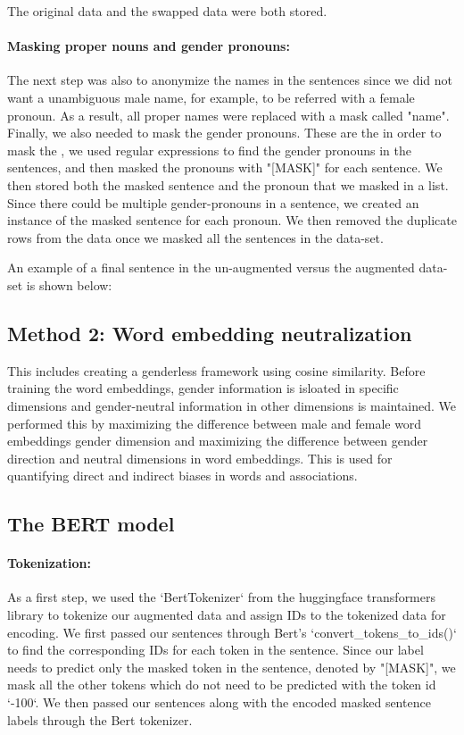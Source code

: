 \documentclass[10pt]{article}
\begin{document}
The original data and the swapped data were both stored.

\paragraph{Masking proper nouns and gender pronouns:}
The next step was also to anonymize the names in the sentences since we did not want a unambiguous male name, for example, to be referred with a female pronoun. As a result, all proper names were replaced with a mask called "name". Finally, we also needed to mask the gender pronouns. These are the in order to mask the , we used regular expressions to find the gender pronouns in the sentences, and then masked the pronouns with "[MASK]" for each sentence. We then stored both the masked sentence and the pronoun that we masked in a list. Since there could be multiple gender-pronouns in a sentence, we created an instance of the masked sentence for each pronoun. We then removed the duplicate rows from the data once we masked all the sentences in the data-set.

An example of a final sentence in the un-augmented versus the augmented data-set is shown below:


\subsection{Method 2: Word embedding neutralization} \label{word_embed_neutral}
This includes creating a genderless framework using cosine similarity. Before training the word embeddings, gender information is isloated in specific dimensions and gender-neutral information in other dimensions is maintained. We performed this by maximizing the difference between male and female word embeddings gender dimension and maximizing the difference between gender direction and neutral dimensions in word embeddings. This is used for quantifying direct and indirect biases in words and associations.

\subsection{The BERT model}
\paragraph{Tokenization: }
As a first step, we used the `BertTokenizer` from the huggingface transformers library to tokenize our augmented data and assign IDs to the tokenized data for encoding. 
We first passed our sentences through Bert's `convert\_tokens\_to\_ids()` to find the corresponding IDs for each token in the sentence. Since our label needs to predict only the masked token in the sentence, denoted by "[MASK]", we mask all the other tokens which do not need to be predicted with the token id `-100`. We then passed our sentences along with the encoded masked sentence labels through the Bert tokenizer.
\end{document}
